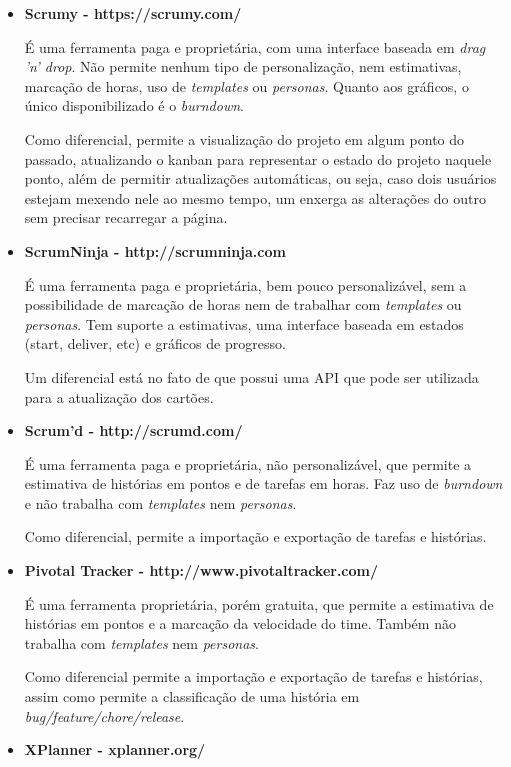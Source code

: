 \begin{itemize}
\item{\textbf{Scrumy - https://scrumy.com/}

É uma ferramenta paga e proprietária, com uma interface baseada em \textit{drag 'n' drop}. Não permite nenhum tipo de personalização, nem estimativas, marcação de horas, uso de \textit{templates} ou \textit{personas}. Quanto aos gráficos, o único disponibilizado é o \textit{burndown}. 

Como diferencial, permite a visualização do projeto em algum ponto do passado, atualizando o kanban para representar o estado do projeto naquele ponto, além de permitir atualizações automáticas, ou seja, caso dois usuários estejam mexendo nele ao mesmo tempo, um enxerga as alterações do outro sem precisar recarregar a página.}

\item{\textbf{ScrumNinja - http://scrumninja.com}

É uma ferramenta paga e proprietária, bem pouco personalizável, sem a possibilidade de marcação de horas nem de trabalhar com \textit{templates} ou \textit{personas}. Tem suporte a estimativas, uma interface baseada em estados (start, deliver, etc) e gráficos de progresso. 

Um diferencial está no fato de que possui uma API que pode ser utilizada para a atualização dos cartões.}

\item{\textbf{Scrum'd - http://scrumd.com/}

É uma ferramenta paga e proprietária, não personalizável, que permite a estimativa de histórias em pontos e de tarefas em horas. Faz uso de \textit{burndown} e não trabalha com \textit{templates} nem \textit{personas}. 

Como diferencial, permite a importação e exportação de tarefas e histórias.}

\item{\textbf{Pivotal Tracker - http://www.pivotaltracker.com/}

É uma ferramenta proprietária, porém gratuita, que permite a estimativa de histórias em pontos e a marcação da velocidade do time. Também não trabalha com \textit{templates} nem \textit{personas}. 

Como diferencial permite a importação e exportação de tarefas e histórias, assim como permite a classificação de uma história em \textit{bug/feature/chore/release}.}

\item{\textbf{XPlanner - xplanner.org/}

}
\end{itemize}
